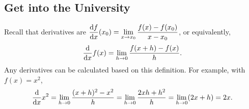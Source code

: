 \documentclass[11pt,pdfa,lastpage]{MishoNote}
\newif\ifBasicForm\BasicFormtrue
\begin{document}
\ifBasicForm\else\pagebreak\fi

\subsection{Get into the University}
Recall that derivatives are 
$\displaystyle\diff{f}{x}(x_0)=\lim_{x\to x_0}\frac{f(x)-f(x_0)}{x-x_0}$, or equivalently,
\begin{equation}
\diff{}{x}f(x)=\lim_{h\to 0}\frac{f(x+h)-f(x)}{h}.\label{eq:diff}
\end{equation}
Any derivatives can be calculated based on this definition. For example, with $f(x)=x^2$,
\begin{equation}
  \diff{}{x}x^2=\lim_{h\to 0}\frac{(x+h)^2-x^2}{h}=\lim_{h\to 0}\frac{2xh+h^2}{h}=\lim_{h\to 0}(2x+h)=2x.
  \label{eq:diffdefex}
\end{equation}
\end{document}
